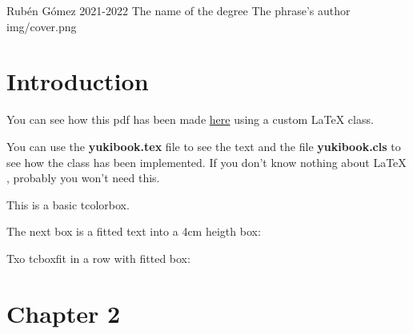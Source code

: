 \documentclass{yukibook}
\begin{document}
  {Rubén Gómez}  %
  {2021-2022}    %
  {The name \linebreak of the degree} %
  {}	%
  {The phrase's author}	%
  {img/cover.png}



\chapter{Introduction}
You can see how this pdf has been made \href{https://github.com/yuki/yukibook.cls}{here} using a custom \LaTeX{}  class.

You can use the \textbf{yukibook.tex} file to see the text and the file \textbf{yukibook.cls} to see how the class has been implemented. If you don't know nothing about \LaTeX{} , probably you won't need this.



\begin{tcolorbox}
This is a basic tcolorbox.

\Blindtext[1]
\end{tcolorbox}

\begin{tcolorbox}[title=Tcolorbox with title]
\Blindtext[1]
\end{tcolorbox}

The next box is a fitted text into a 4cm heigth box:


Txo tcboxfit in a row with fitted box:
\begin{tcbraster}[colback=green!10!white,boxsep=1mm]
\tcboxfit[height=4cm]{\Blindtext[1]}
\tcboxfit[height=4cm]{\Blindtext[1]}
\end{tcbraster}



\Blindtext[1]

\chapter{Chapter 2}
\Blindtext[1]
\end{document}
